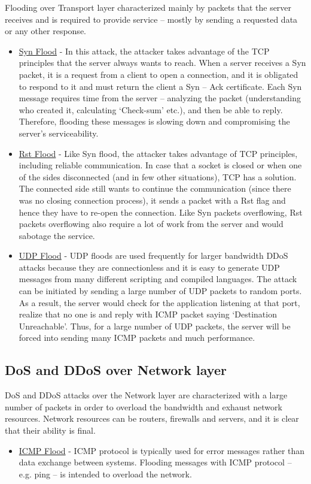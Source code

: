 \documentclass{report}
\begin{document}
 Flooding over Transport layer characterized mainly by packets that the server receives and is required to provide service – mostly by sending a requested data or any other response\cite{QuickGuide}.\begin{itemize}
 \item\underline{Syn Flood} - In this attack, the attacker takes advantage of the TCP principles that the server always wants to reach. When a server receives a Syn packet, it is a request from a client to open a connection, and it is obligated to respond to it and must return the client a Syn – Ack certificate. Each Syn message requires time from the server – analyzing the packet (understanding who created it, calculating ‘Check-sum’ etc.), and then be able to reply. Therefore, flooding these messages is slowing down and compromising the server’s serviceability.

\item\underline{Rst Flood} - Like Syn flood, the attacker takes advantage of TCP principles, including reliable communication. In case that a socket is closed or when one of the sides disconnected (and in few other situations), TCP has a solution. The connected side still wants to continue the communication (since there was no closing connection process), it sends a packet with a Rst flag and hence they have to re-open the connection. Like Syn packets overflowing, Rst packets overflowing also require a lot of work from the server and would sabotage the service.

\item\underline{UDP Flood} - UDP floods are used frequently for larger bandwidth DDoS attacks because they are connectionless and it is easy to generate UDP messages from many different scripting and compiled languages. The attack can be initiated by sending a large number of UDP packets to random ports. As a result, the server would check for the application listening at that port, realize that no one is and reply with ICMP packet saying ‘Destination Unreachable’. Thus, for a large number of UDP packets, the server will be forced into sending many ICMP packets and much performance.
\end{itemize}
\newpage
\subsection {DoS and DDoS over Network layer} 

 \hfill \break DoS and DDoS attacks over the Network layer are characterized with a large number of packets in order to overload the bandwidth and exhaust network resources. Network resources can be routers, firewalls and servers, and it is clear that their ability is final.
\begin{itemize}
\item\underline{ICMP Flood} - ICMP protocol is typically used for error messages rather than data exchange between systems. Flooding messages with ICMP protocol – e.g. ping – is intended to overload the network.
\end{itemize}
 \hfill \break
\end{document}
